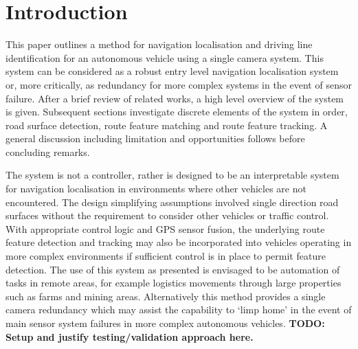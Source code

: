 \documentclass[]{aiaa-tc}%
\begin{document}

\newpage
\section{Introduction} \label{sect:intro}

%

This paper outlines a method for navigation localisation and driving line identification for an autonomous vehicle using a single camera system. This system can be considered as a robust entry level navigation localisation system or, more critically, as redundancy for more complex systems in the event of sensor failure. After a brief review of related works, a high level overview of the system is given. Subsequent sections investigate discrete elements of the system in order, road surface detection, route feature matching and route feature tracking. A general discussion including limitation and opportunities follows before concluding remarks.

The system is not a controller, rather is designed to be an interpretable system for navigation localisation in environments where other vehicles are not encountered. The design simplifying assumptions involved single direction road surfaces without the requirement to consider other vehicles or traffic control. With appropriate control logic and GPS sensor fusion, the underlying route feature detection and tracking may also be incorporated into vehicles operating in more complex environments if sufficient control is in place to permit feature detection. The use of this system as presented is envisaged to be automation of tasks in remote areas, for example logistics movements through large properties such as farms and mining areas. Alternatively this method provides a single camera redundancy which may assist the capability to `limp home' in the event of main sensor system failures in more complex autonomous vehicles. \textbf{TODO: Setup and justify testing/validation approach here.}
\end{document}
